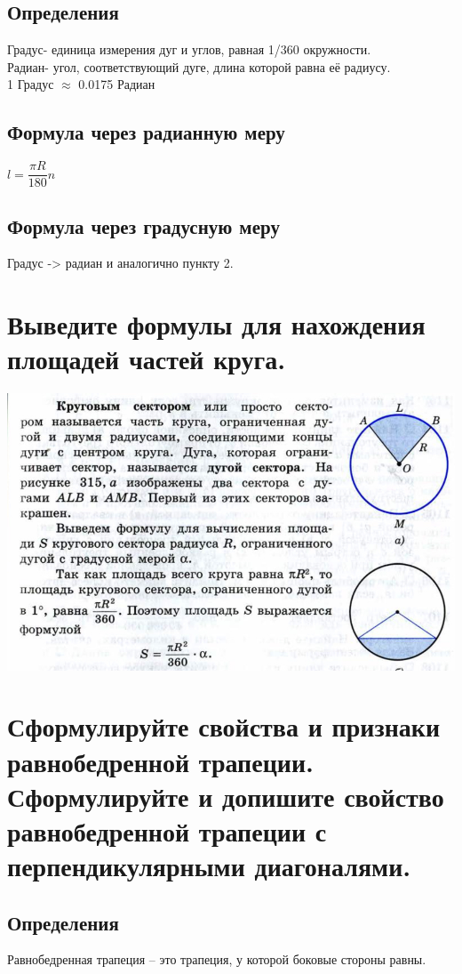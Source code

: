 \documentclass[12pt, letterpaper]{article}
\begin{document}
\subsection{Определения}
Градус- единица измерения дуг и углов, равная 1/360 окружности. \\
Радиан- угол, соответствующий дуге, длина которой равна её радиусу. \\
1 Градус $\approx$ 0.0175 Радиан \\
\subsection{Формула через радианную меру}
$ l=\dfrac{\pi R}{180} n $ \\
\subsection{Формула через градусную меру}
Градус -> радиан и аналогично пункту 2. \\ 


\section {Выведите формулы для нахождения площадей частей круга. }
\includegraphics[scale=0.3]{legal-4.jpg} \\

\section {Сформулируйте свойства и признаки равнобедренной трапеции. Сформулируйте и допишите свойство равнобедренной трапеции с перпендикулярными диагоналями.}
\subsection{Определения}
Равнобедренная трапеция -- это трапеция, у которой боковые стороны равны. \\
\end{document}
